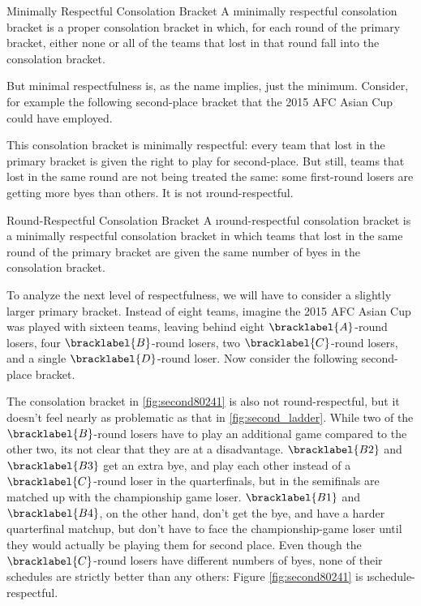 {    

    \begin{definition}{Minimally Respectful Consolation Bracket}{}
        A \i{minimally respectful} consolation bracket is a proper consolation bracket in which, for each round of the primary bracket, either none or all of the teams that lost in that round fall into the consolation bracket.
    \end{definition}

    But minimal respectfulness is, as the name implies, just the minimum. Consider, for example the following second-place bracket that the 2015 AFC Asian Cup could have employed.


    This consolation bracket is minimally respectful: every team that lost in the primary bracket is given the right to play for second-place. But still, teams that lost in the same round are not being treated the same: some first-round losers are getting more byes than others. It is not \i{round-respectful}.

    \begin{definition}{Round-Respectful Consolation Bracket}{}
        A \i{round-respectful} consolation bracket is a minimally respectful consolation bracket in which teams that lost in the same round of the primary bracket are given the same number of byes in the consolation bracket.
    \end{definition}

    To analyze the next level of respectfulness, we will have to consider a slightly larger primary bracket. Instead of eight teams, imagine the 2015 AFC Asian Cup was played with sixteen teams, leaving behind eight $\bracklabel{A}$-round losers, four $\bracklabel{B}$-round losers, two $\bracklabel{C}$-round losers, and a single $\bracklabel{D}$-round loser. Now consider the following second-place bracket.


    The consolation bracket in \ref{fig:second80241} is also not round-respectful, but it doesn't feel nearly as problematic as that in \ref{fig:second_ladder}. While two of the $\bracklabel{B}$-round losers have to play an additional game compared to the other two, its not clear that they are at a disadvantage. $\bracklabel{B2}$ and $\bracklabel{B3}$ get an extra bye, and play each other instead of a $\bracklabel{C}$-round loser in the quarterfinals, but in the semifinals are matched up with the championship game loser. $\bracklabel{B1}$ and $\bracklabel{B4}$, on the other hand, don't get the bye, and have a harder quarterfinal matchup, but don't have to face the championship-game loser until they would actually be playing them for second place. Even though the $\bracklabel{C}$-round losers have different numbers of byes, none of their schedules are strictly better than any others: Figure \ref{fig:second80241} is \i{schedule-respectful}.

}
